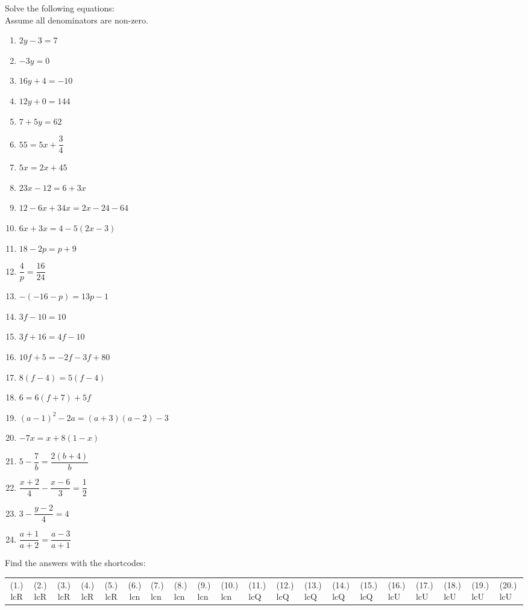 \begin{exercises}{}
{
Solve the following equations: \\
Assume all denominators are non-zero.
\begin{multicols}{2}
\begin{enumerate}[noitemsep, label=\textbf{\arabic*}. ] 
\item   $2y-3=7$
\item   $-3y=0$        
\item   $16y+4=-10$        
\item   $12y+0=144$
\item   $7+5y=62$   \vspace{6pt}     
\item  $55=5x+\dfrac{3}{4}$ \vspace{6pt}
\item   $5x=2x+45$        
\item  $23x-12=6+3x$
\item   $12-6x+34x=2x-24-64$
\item   $6x+3x=4-5(2x-3)$
\item   $18-2p=p+9$   \vspace{6pt}
\item   $\dfrac{4}{p}=\dfrac{16}{24}$
\item   $-(-16-p)=13p-1$
\item   $3f-10=10$
\item   $3f+16=4f-10$
\item   $10f+5=-2f-3f+80$
\item   $8(f-4)=5(f-4)$
\item  $6=6(f+7)+5f$      
\item $(a-1)^{2} - 2a = (a+3)(a-2) - 3$
\item $-7x = x+8(1-x)$ \vspace{6pt}
\item $5-\dfrac{7}{b} = \dfrac{2(b+4)}{b}$\vspace{6pt}
\item $\dfrac{x+2}{4} - \dfrac{x-6}{3} = \dfrac{1}{2}$\vspace{6pt}
\item $ 3 - \dfrac{y-2}{4} = 4$\vspace{6pt}
\item $ \dfrac{a+1}{a+2} = \dfrac{a-3}{a+1}$
  
\end{enumerate}
\end{multicols}
\par {} Find the answers with the shortcodes:
\par \begin{tabular}[h]{cccccc}
(1.) lcR  &  (2.) lcR  &  (3.) lcR  &  (4.) lcR  &  (5.) lcR  &  (6.) lcn  &  (7.) lcn  &  (8.) lcn  &  (9.) lcn  &  (10.) lcn  &  (11.) lcQ  &  (12.) lcQ  &  (13.) lcQ  &  (14.) lcQ  &  (15.) lcQ  &  (16.) lcU  &  (17.) lcU  &  (18.) lcU  &  (19.) lcU  &  (20.) lcU  & \end{tabular}
}
\end{exercises}

